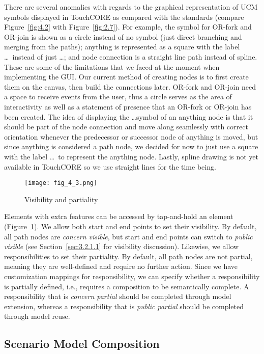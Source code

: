 There are several anomalies with regards to the graphical representation of UCM symbols displayed in TouchCORE as compared with the standards (compare Figure~\ref{fig:4.2} with Figure~\ref{fig:2.7}). For example, the symbol for OR-fork and OR-join is shown as a circle instead of no symbol (just direct branching and merging from the paths); anything is represented as a square with the label \ldots\ instead of just \ldots; and node connection is a straight line path instead of spline. These are some of the limitations that we faced at the moment when implementing the GUI. Our current method of creating nodes is to first create them on the canvas, then build the connections later. OR-fork and OR-join need a space to receive events from the user, thus a circle serves as the area of interactivity as well as a statement of presence that an OR-fork or OR-join has been created. The idea of displaying the \ldots symbol of an anything node is that it should be part of the node connection and move along seamlessly with correct orientation whenever the predecessor or successor node of anything is moved, but since anything is considered a path node, we decided for now to just use a square with the label \ldots\ to represent the anything node. Lastly, spline drawing is not yet available in TouchCORE so we use straight lines for the time being.

\begin{figure}
	\centering
	\texttt{[image: fig\_4\_3.png]}
	\caption{Visibility and partiality}
	\label{fig:4.3}
\end{figure}

Elements with extra features can be accessed by tap-and-hold an element (Figure~\ref{fig:4.3}). We allow both start and end points to set their visibility. By default, all path nodes are \emph{concern visible}, but start and end points can switch to \emph{public visible} (see Section~\ref{sec:3.2.1.1} for visibility discussion). Likewise, we allow responsibilities to set their partiality. By default, all path nodes are not partial, meaning they are well-defined and require no further action. Since we have customization mappings for responsibility, we can specify whether a responsibility is partially defined, i.e., requires a composition to be semantically complete. A responsibility that is \emph{concern partial} should be completed through model extension, whereas a responsibility that is \emph{public partial} should be completed through model reuse.

\subsection{Scenario Model Composition}

